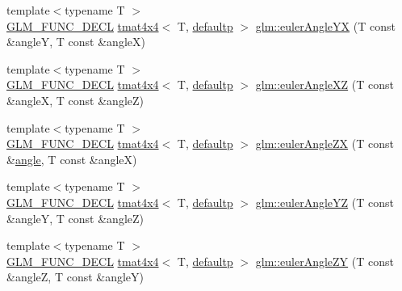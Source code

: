 \begin{DoxyCompactItemize}
\item 
{\footnotesize template$<$typename T $>$ }\\\mbox{\hyperlink{setup_8hpp_ab2d052de21a70539923e9bcbf6e83a51}{G\+L\+M\+\_\+\+F\+U\+N\+C\+\_\+\+D\+E\+CL}} \mbox{\hyperlink{structglm_1_1tmat4x4}{tmat4x4}}$<$ T, \mbox{\hyperlink{namespaceglm_a0f04f086094c747d227af4425893f545a9d21ccd8b5a009ec7eb7677befc3bf51}{defaultp}} $>$ \mbox{\hyperlink{group__gtx__euler__angles_gafdd02f9a37511190962119adef5c1c25}{glm\+::euler\+Angle\+YX}} (T const \&angleY, T const \&angleX)
\item 
{\footnotesize template$<$typename T $>$ }\\\mbox{\hyperlink{setup_8hpp_ab2d052de21a70539923e9bcbf6e83a51}{G\+L\+M\+\_\+\+F\+U\+N\+C\+\_\+\+D\+E\+CL}} \mbox{\hyperlink{structglm_1_1tmat4x4}{tmat4x4}}$<$ T, \mbox{\hyperlink{namespaceglm_a0f04f086094c747d227af4425893f545a9d21ccd8b5a009ec7eb7677befc3bf51}{defaultp}} $>$ \mbox{\hyperlink{group__gtx__euler__angles_gab2d7dc94b9a7519d741aaa208c7a335b}{glm\+::euler\+Angle\+XZ}} (T const \&angleX, T const \&angleZ)
\item 
{\footnotesize template$<$typename T $>$ }\\\mbox{\hyperlink{setup_8hpp_ab2d052de21a70539923e9bcbf6e83a51}{G\+L\+M\+\_\+\+F\+U\+N\+C\+\_\+\+D\+E\+CL}} \mbox{\hyperlink{structglm_1_1tmat4x4}{tmat4x4}}$<$ T, \mbox{\hyperlink{namespaceglm_a0f04f086094c747d227af4425893f545a9d21ccd8b5a009ec7eb7677befc3bf51}{defaultp}} $>$ \mbox{\hyperlink{group__gtx__euler__angles_gaef83cf40bd9ae780011b29970f16f622}{glm\+::euler\+Angle\+ZX}} (T const \&\mbox{\hyperlink{group__gtc__quaternion_gad4a4448baedb198b2b1e7880d2544dc9}{angle}}, T const \&angleX)
\item 
{\footnotesize template$<$typename T $>$ }\\\mbox{\hyperlink{setup_8hpp_ab2d052de21a70539923e9bcbf6e83a51}{G\+L\+M\+\_\+\+F\+U\+N\+C\+\_\+\+D\+E\+CL}} \mbox{\hyperlink{structglm_1_1tmat4x4}{tmat4x4}}$<$ T, \mbox{\hyperlink{namespaceglm_a0f04f086094c747d227af4425893f545a9d21ccd8b5a009ec7eb7677befc3bf51}{defaultp}} $>$ \mbox{\hyperlink{group__gtx__euler__angles_ga1033f84f51d61646145352ef0c1bb58c}{glm\+::euler\+Angle\+YZ}} (T const \&angleY, T const \&angleZ)
\item 
{\footnotesize template$<$typename T $>$ }\\\mbox{\hyperlink{setup_8hpp_ab2d052de21a70539923e9bcbf6e83a51}{G\+L\+M\+\_\+\+F\+U\+N\+C\+\_\+\+D\+E\+CL}} \mbox{\hyperlink{structglm_1_1tmat4x4}{tmat4x4}}$<$ T, \mbox{\hyperlink{namespaceglm_a0f04f086094c747d227af4425893f545a9d21ccd8b5a009ec7eb7677befc3bf51}{defaultp}} $>$ \mbox{\hyperlink{group__gtx__euler__angles_ga02f037926568bbd12dfece3b28b20343}{glm\+::euler\+Angle\+ZY}} (T const \&angleZ, T const \&angleY)

\end{DoxyCompactItemize}

